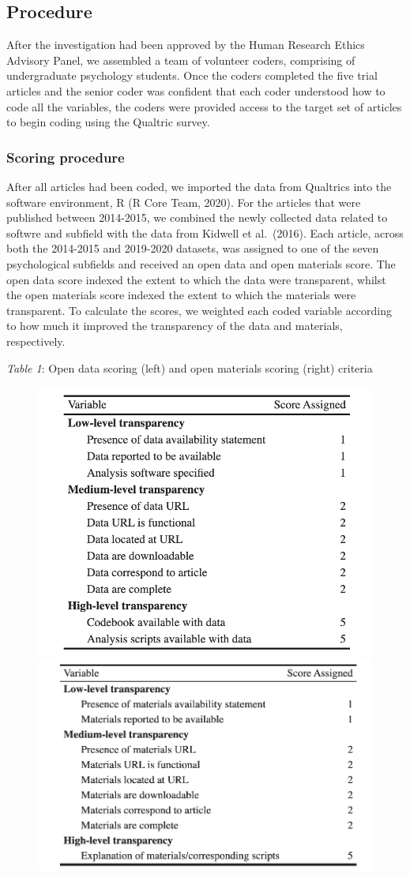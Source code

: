 \documentclass[
  english,
  man,floatsintext]{apa6}
\begin{document}
\hypertarget{procedure}{%
\subsection{Procedure}\label{procedure}}

After the investigation had been approved by the Human Research Ethics Advisory Panel, we assembled a team of volunteer coders, comprising of undergraduate psychology students. Once the coders completed the five trial articles and the senior coder was confident that each coder understood how to code all the variables, the coders were provided access to the target set of articles to begin coding using the Qualtric survey.

\hypertarget{scoring-procedure}{%
\subsubsection{Scoring procedure}\label{scoring-procedure}}

After all articles had been coded, we imported the data from Qualtrics into the software environment, R (R Core Team, 2020). For the articles that were published between 2014-2015, we combined the newly collected data related to softwre and subfield with the data from Kidwell et al.~(2016). Each article, across both the 2014-2015 and 2019-2020 datasets, was assigned to one of the seven psychological subfields and received an open data and open materials score. The open data score indexed the extent to which the data were transparent, whilst the open materials score indexed the extent to which the materials were transparent. To calculate the scores, we weighted each coded variable according to how much it improved the transparency of the data and materials, respectively.

\emph{Table 1}: Open data scoring (left) and open materials scoring (right) criteria

\begin{figure}

{\centering \includegraphics[width=0.49\linewidth,height=0.2\textheight]{data_scoring} \includegraphics[width=0.49\linewidth,height=0.2\textheight]{mat_scoring} 

}

\end{figure}
\end{document}
